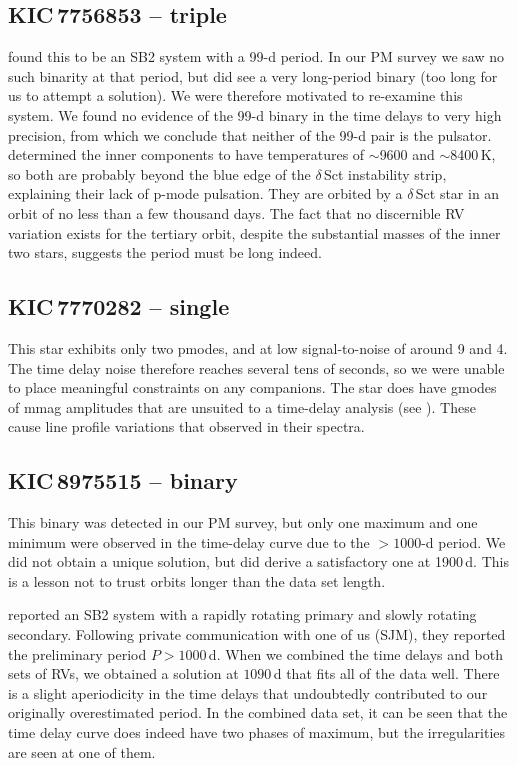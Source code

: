 \documentclass[a4paper,fleqn,usenatbib]{mnras}
\begin{document}
\subsection{KIC\,7756853 -- triple}
\citeauthor{lampensetal2017} found this to be an SB2 system with a 99-d period. In our PM survey we saw no such binarity at that period, but did see a very long-period binary (too long for us to attempt a solution). We were therefore motivated to re-examine this system. We found no evidence of the 99-d binary in the time delays to very high precision, from which we conclude that neither of the 99-d pair is the pulsator. \citeauthor{lampensetal2017} determined the inner components to have temperatures of $\sim$9600 and $\sim$8400\,K, so both are probably beyond the blue edge of the $\delta$\,Sct instability strip, explaining their lack of p-mode pulsation. They are orbited by a $\delta$\,Sct star in an orbit of no less than a few thousand days. The fact that no discernible RV variation exists for the tertiary orbit, despite the substantial masses of the inner two stars, suggests the period must be long indeed.


\subsection{KIC\,7770282 -- single}
This star exhibits only two p\:modes, and at low signal-to-noise of around 9 and 4. The time delay noise therefore reaches several tens of seconds, so we were unable to place meaningful constraints on any companions. The star does have g\:modes of mmag amplitudes that are unsuited to a time-delay analysis (see \citealt{comptonetal2016}). These cause line profile variations that \citeauthor{lampensetal2017} observed in their spectra.


\subsection{KIC\,8975515 -- binary}
This binary was detected in our PM survey, but only one maximum and one minimum were observed in the time-delay curve due to the $>1000$-d period. We did not obtain a unique solution, but did derive a satisfactory one at 1900\,d. This is a lesson not to trust orbits longer than the data set length.

\citeauthor{lampensetal2017} reported an SB2 system with a rapidly rotating primary and slowly rotating secondary. Following private communication with one of us (SJM), they reported the preliminary period $P>1000$\,d. When we combined the time delays and both sets of RVs, we obtained a solution at $1090$\,d that fits all of the data well. There is a slight aperiodicity in the time delays that undoubtedly contributed to our originally overestimated period. In the combined data set, it can be seen that the time delay curve does indeed have two phases of maximum, but the irregularities are seen at one of them.
\end{document}
